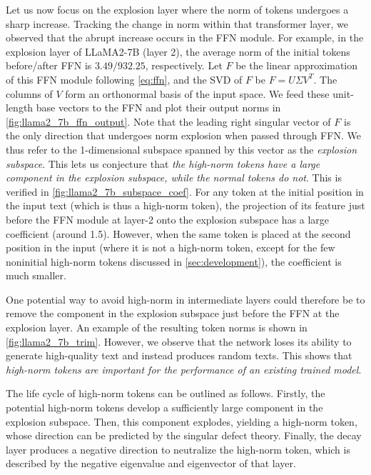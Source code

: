 Let us now focus on the explosion layer where the norm of tokens undergoes a sharp increase.
Tracking the change in norm within that transformer layer, we observed that the abrupt increase occurs in the FFN module.
For example, in the explosion layer of LLaMA2-7B (layer 2), the average norm of the initial tokens before/after FFN is \(3.49/932.25\), respectively.
Let \(F\) be the linear approximation of this FFN module following \cref{eq:ffn}, and the SVD of \(F\) be \(F=U\Sigma V^T\).
The columns of \(V\) form an orthonormal basis of the input space.
We feed these unit-length base vectors to the FFN and plot their output norms in \cref{fig:llama2_7b_ffn_output}.
Note that the leading right singular vector of \(F\) is the only direction that undergoes norm explosion when passed through FFN.
We thus refer to the 1-dimensional subspace spanned by this vector as the \emph{explosion subspace}.
This lets us conjecture that \emph{the high-norm tokens have a large component in the explosion subspace, while the normal tokens do not}.
This is verified in \cref{fig:llama2_7b_subspace_coef}.
For any token at the initial position in the input text (which is thus a high-norm token), the projection of its feature just before the FFN module at layer-2 onto the explosion subspace has a large coefficient (around 1.5).
However, when the same token is placed at the second position in the input (where it is not a high-norm token, except for the few noninitial high-norm tokens discussed in \cref{sec:development}), the coefficient is much smaller.

One potential way to avoid high-norm in intermediate layers could therefore be to remove the component in the explosion subspace just before the FFN at the explosion layer.
An example of the resulting token norms is shown in \cref{fig:llama2_7b_trim}.
However, we observe that the network loses its ability to generate high-quality text and instead produces random texts.
This shows that \emph{high-norm tokens are important for the performance of an existing trained model}.

The life cycle of high-norm tokens can be outlined as follows.
Firstly, the potential high-norm tokens develop a sufficiently large component in the explosion subspace.
Then, this component explodes, yielding a high-norm token,
whose direction can be predicted by the singular defect theory.
Finally, the decay layer produces a negative direction to neutralize the high-norm token, which is described by the negative eigenvalue and eigenvector of that layer.
